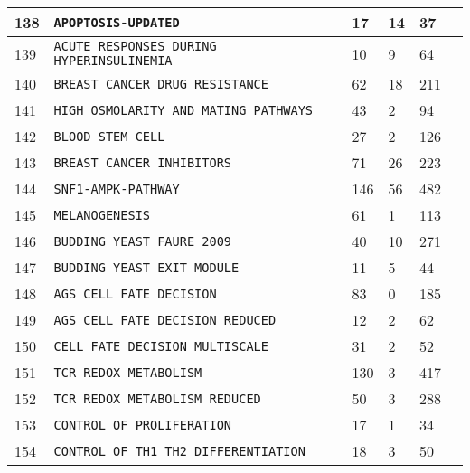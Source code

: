 \documentclass{article}
\begin{document}
\begin{center}
\begin{tabular}{ | C{16pt} | C{149pt} | C{25pt} | C{25pt} | C{25pt} | C{36pt} | }
 		 & \texttt{APOPTOSIS-UPDATED} & 17 & 14 & 37 & \cite{bbm-138} \\
 		 & \texttt{ACUTE RESPONSES DURING HYPERINSULINEMIA} & 10 & 9 & 64 & \cite{bbm-139} \\
 		 & \texttt{BREAST CANCER DRUG RESISTANCE} & 62 & 18 & 211 & \cite{bbm-140} \\
 		 & \texttt{HIGH OSMOLARITY AND MATING PATHWAYS} & 43 & 2 & 94 & \cite{bbm-141} \\
 		 & \texttt{BLOOD STEM CELL} & 27 & 2 & 126 & \cite{bbm-142} \\
 		 & \texttt{BREAST CANCER INHIBITORS} & 71 & 26 & 223 & \cite{bbm-143} \\
 		 & \texttt{SNF1-AMPK-PATHWAY} & 146 & 56 & 482 & \cite{bbm-144} \\
 		 & \texttt{MELANOGENESIS} & 61 & 1 & 113 & \cite{bbm-145} \\
 		 & \texttt{BUDDING YEAST FAURE 2009} & 40 & 10 & 271 & \cite{bbm-146-147-159-180} \\
 		 & \texttt{BUDDING YEAST EXIT MODULE} & 11 & 5 & 44 & \cite{bbm-146-147-159-180} \\
 		 & \texttt{AGS CELL FATE DECISION} & 83 & 0 & 185 & \cite{bbm-148-149} \\
 		 & \texttt{AGS CELL FATE DECISION REDUCED} & 12 & 2 & 62 & \cite{bbm-148-149} \\
 		 & \texttt{CELL FATE DECISION MULTISCALE} & 31 & 2 & 52 & \cite{bbm-008-150} \\
 		 & \texttt{TCR REDOX METABOLISM} & 130 & 3 & 417 & \cite{bbm-151-152} \\
 		 & \texttt{TCR REDOX METABOLISM REDUCED} & 50 & 3 & 288 & \cite{bbm-151-152} \\
 		 & \texttt{CONTROL OF PROLIFERATION} & 17 & 1 & 34 & \cite{bbm-153} \\
 		 & \texttt{CONTROL OF TH1 TH2 DIFFERENTIATION} & 18 & 3 & 50 & \cite{bbm-154} \\
 		\hline
 	\end{tabular}
 

\end{center}
\end{document}
